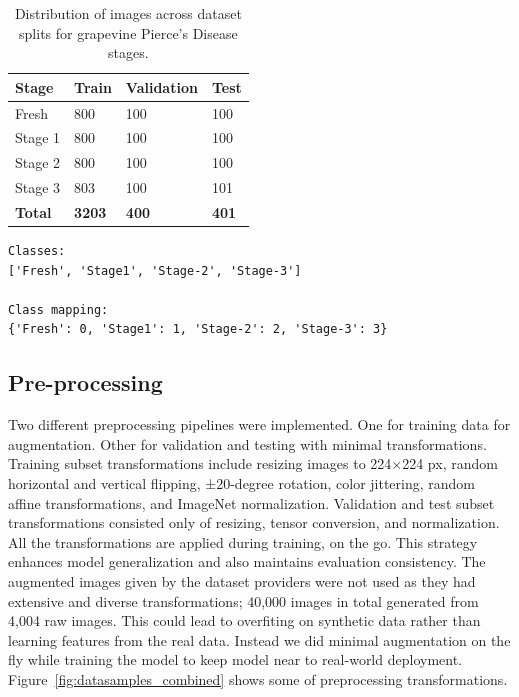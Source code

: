 \documentclass[conference]{IEEEtran}
\begin{document}
\begin{table}[h!]
	\caption{Distribution of images across dataset splits for grapevine Pierce's Disease stages.}
	\centering
	\begin{tabular}{m{} m{} m{} m{}}
		\toprule
		\textbf{Stage} & \textbf{Train} & \textbf{Validation} & \textbf{Test} \\
		\midrule
		Fresh          & 800            & 100                 & 100           \\
		Stage 1        & 800            & 100                 & 100           \\
		Stage 2        & 800            & 100                 & 100           \\
		Stage 3        & 803            & 100                 & 101           \\
		\midrule
		\textbf{Total} & \textbf{3203}  & \textbf{400}        & \textbf{401}  \\
		\bottomrule
	\end{tabular}
	\label{tab:data_distribution}
\end{table}

\begin{lstlisting}[style=ieeelisting, frame=none,
caption={Dataset Classes mapping},
label={lst:classmapping}]
Classes:
['Fresh', 'Stage1', 'Stage-2', 'Stage-3']

Class mapping:
{'Fresh': 0, 'Stage1': 1, 'Stage-2': 2, 'Stage-3': 3}
\end{lstlisting}

\subsection{Pre-processing}
Two different preprocessing pipelines were implemented. One for training data for augmentation. Other for validation and testing with minimal transformations. Training subset transformations include resizing images to 224×224 px, random horizontal and vertical flipping, ±20-degree rotation, color jittering, random affine transformations, and ImageNet normalization. Validation and test subset transformations consisted only of resizing, tensor conversion, and normalization. All the transformations are applied during training, on the go. This strategy enhances model generalization and also maintains evaluation consistency. The augmented images  given by the dataset providers were not used as they had extensive and diverse transformations; 40,000 images in total generated from 4,004 raw images. This could lead to overfiting on synthetic data rather than learning features from the real data. Instead we did minimal augmentation on the fly while training the model to keep model near to real-world deployment. Figure~\ref{fig:datasamples_combined} shows some of preprocessing transformations.
\end{document}

